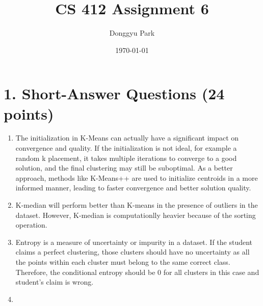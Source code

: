 \documentclass[12pt]{article}
\title{CS 412 Assignment 6}
\author{Donggyu Park}
\date{\today}
\begin{document}
\maketitle

\section*{1. Short-Answer Questions (24 points)}

\begin{enumerate}[label=(\alph*)]

    \item 

    The initialization in K-Means can actually have a significant impact on convergence and quality. 
    If the initialization is not ideal, for example a random k placement, it takes multiple iterations to converge to a good solution, and the final clustering may still be suboptimal. As a better approach, methods like K-Means++ are used to initialize centroids in a more informed manner, leading to faster convergence and better solution quality.


    \vspace{2em}

    \item 

    K-median will perform better than K-means in the presence of outliers in the dataset. However, K-median is computationlly heavier because of the sorting operation. 


    \vspace{2em}

    \item

    Entropy is a measure of uncertainty or impurity in a dataset. 
    If the student claims a perfect clustering, those clusters should have no uncertainty 
    as all the points within each cluster must belong to the same correct class. 
    Therefore, the conditional entropy should be 0 for all clusters in this case 
    and student's claim is wrong.


    \vspace{2em}

    \item 


\end{enumerate}
\end{document}
